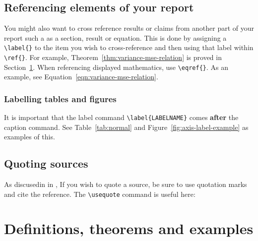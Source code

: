 \subsection{Referencing elements of your report}

You might also want to cross reference results or claims from another part of your report such a as a section, result or equation. This is done by assigning a \texttt{\textbackslash label\{\}} to the item you wish to cross-reference and then using that label within \texttt{\textbackslash ref\{\}}. For example, Theorem~\ref{thm:variance-mse-relation} is proved in Section~\ref{sec:defnthms}. When referencing displayed mathematics, use \texttt{\textbackslash eqref\{\}}. As an example, see 
Equation~\eqref{eqn:variance-mse-relation}.

\subsubsection{Labelling tables and figures}

It is important that the label command
\texttt{\textbackslash label\{LABELNAME\}} comes \textbf{after} the caption command.
See Table~\ref{tab:normal} and Figure~\ref{fig:axis-label-example} as examples of this.

\subsection{Quoting sources}
As discusedin in \textcite{akyildizNudgingParticleFilter2020}, If you wish to quote a source, be sure to use quotation marks and cite the
reference. The \texttt{\textbackslash{usequote}} command is useful here:

\parencite{akyildizNudgingParticleFilter2020}

\section{Definitions, theorems and examples}
\label{sec:defnthms}

